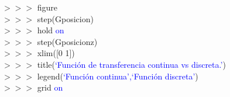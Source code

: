 \begin{tcolorbox}[sharp corners, colframe=bluebox, title= Funciones de
  transferencia.]
  $>>>$ figure\\
  $>>>$ step(Gposicion)\\
  $>>>$ hold \textcolor{blue}{on}\\
  $>>>$ step(Gposicionz)\\
  $>>>$ xlim([0 1])\\
  $>>>$ title(\textcolor{blue}{`Función de transferencia continua vs discreta.'})\\
  $>>>$ legend(\textcolor{blue}{`Función continua',`Función discreta'})\\
  $>>>$ grid \textcolor{blue}{on}\\
\end{tcolorbox}%

